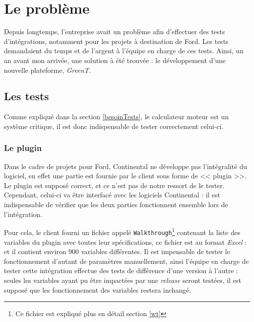 \chapter{Le problème} \label{chapPb}
\begin{figure}
\vspace{-25px}
\begin{minipage}{0.60\textwidth}
\minitoc
\end{minipage}
\end{figure}
Depuis longtemps, l'entreprise avait un problème afin d'effectuer des tests d'intégrations, notamment pour les projets à destination de Ford. Les tests demandaient du temps et de l'argent à l'équipe en charge de ces tests. Ainsi, un an avant mon arrivée, une solution à été trouvée : le développement d'une nouvelle plateforme, \textit{GreenT}.

\vspace{-32px}
	\section{Les tests} \label{pbTests}
	Comme expliqué dans la section \ref{besoinTests}, le calculateur moteur est un système critique, il est donc indispensable de tester correctement celui-ci.

	\subsection{Le plugin}
	Dans le cadre de projets pour Ford, Continental ne développe pas l'intégralité du logiciel, en effet une partie est fournie par le client sous forme de << plugin >>. Le plugin est supposé correct, et ce n'est pas de notre ressort de le tester. Cependant, celui-ci va être interfacé avec les logiciels Continental : il est indispensable de vérifier que les deux parties fonctionnent ensemble lors de l'intégration.

	Pour cela, le client fourni un fichier appelé \texttt{Walkthrough}\footnote{Ce fichier est expliqué plus en détail section \ref{wt}} contenant la liste des variables du plugin avec toutes leur spécifications, ce fichier est au format \textit{Excel} : et il contient environ 900 variables différentes. Il est impensable de tester le fonctionnement d'autant de paramètres manuellement, ainsi l'équipe en charge de tester cette intégration effectue des tests de différence d'une version à l'autre : seules les variables ayant pu être impactées par une \textit{release} seront testées, il est supposé que les fonctionnement des variables restera inchangé.

